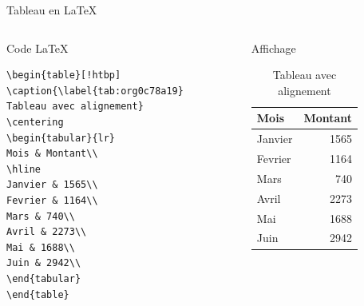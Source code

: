 \documentclass[presentation,t]{beamer}
\begin{document}
\begin{frame}[fragile,label={sec:org507ae05}]{Tableau en \LaTeX{}}
 \begin{columns}
\begin{column}{0.48\columnwidth}
Code \LaTeX{}

\lstset{language=[LaTeX]TeX,label= ,caption= ,captionpos=b,numbers=none}
\begin{lstlisting}
\begin{table}[!htbp]
\caption{\label{tab:org0c78a19}
Tableau avec alignement}
\centering
\begin{tabular}{lr}
Mois & Montant\\
\hline
Janvier & 1565\\
Fevrier & 1164\\
Mars & 740\\
Avril & 2273\\
Mai & 1688\\
Juin & 2942\\
\end{tabular}
\end{table}
\end{lstlisting}

\pause{}
\end{column}

\begin{column}{0.48\columnwidth}
Affichage

\begin{mdframed}
\begin{table}[!htbp]
\caption{\label{achats-par-mois}Tableau avec alignement}
\centering
\begin{tabular}{lr}
Mois & Montant\\
\hline
Janvier & 1565\\
Fevrier & 1164\\
Mars & 740\\
Avril & 2273\\
Mai & 1688\\
Juin & 2942\\
\end{tabular}
\end{table}

\end{mdframed}
\end{column}
\end{columns}
\end{frame}
\end{document}
